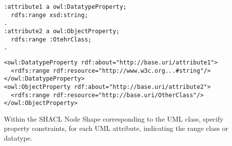 \vspace{-\parskip}
\begin{minipage}[b]{.384\textwidth}
\begin{lstlisting}[language=Turtle, caption={Range specification in Turtle syntax}, captionpos=b]
:attribute1 a owl:DatatypeProperty;
  rdfs:range xsd:string;
.
:attribute2 a owl:ObjectProperty;
  rdfs:range :OtehrClass;
.
\end{lstlisting}
\end{minipage}%
\quad
\vspace{-\parskip}
\begin{minipage}[b]{.55\textwidth}
\begin{lstlisting}[language=RDF/XML, caption={Range specification in RDF/XML syntax}, captionpos=b]
<owl:DatatypeProperty rdf:about="http://base.uri/attribute1">
  <rdfs:range rdf:resource="http://www.w3c.org...#string"/>
</owl:DatatypeProperty>  
<owl:ObjectProperty rdf:about="http://base.uri/attribute2">
  <rdfs:range rdf:resource="http://base.uri/OtherClass"/>
</owl:ObjectProperty>
\end{lstlisting}
\end{minipage}
\vspace{-\parskip}

\begin{trule}
	\label{rule:attribute-ds-range}
	Within the SHACL Node Shape corresponding to the UML class, specify property constraints, for each UML attribute, indicating the range class or datatype.
\end{trule}

